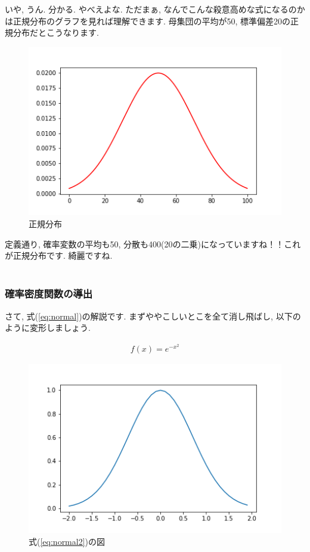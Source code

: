 \documentclass[11pt,a4paper]{jsarticle}                    %
\begin{document}
いや, うん. 分かる. やべえよな. ただまぁ, なんでこんな殺意高めな式になるのかは正規分布のグラフを見れば理解できます. 母集団の平均が50, 標準偏差20の正規分布だとこうなります.

\begin{figure}[H]
\label{im:normal}
  \centering
  \includegraphics[width=120mm,bb=0 0 432 288]{figures/normal.png}
  \caption{正規分布}
\end{figure}

定義通り, 確率変数の平均も50, 分散も400(20の二乗)になっていますね！！これが正規分布です. 綺麗ですね.\\
\\
\subsubsection{確率密度関数の導出}
さて, 式(\ref{eq:normal})の解説です. まずややこしいとこを全て消し飛ばし, 以下のように変形しましょう. 

\begin{eqnarray}
\label{eq:normal2}
f(x) = e^{-x^2}
\end{eqnarray}

\begin{figure}[H]
\label{im:normal}
  \centering
  \includegraphics[width=120mm,bb=0 0 432 288]{figures/normal2.png}
  \caption{式(\ref{eq:normal2})の図}
\end{figure}
\end{document}
